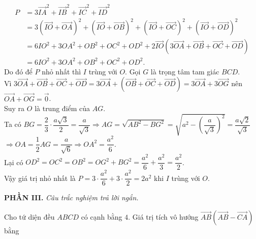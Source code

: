 \begin{ex}
{\begin{enumerate}[a)]
	\begin{align*}
	P& =3\vec{IA}^2+\vec{IB}^2+\vec{IC}^2+\vec{ID}^2 \\
	& =3\left(\vec{IO}+\vec{OA}\right)^2+\left(\vec{IO}+\vec{OB}\right)^2+\left(\vec{IO}+\vec{OC}\right)^2+\left(\vec{IO}+\vec{OD}\right)^2 \\
	& =6IO^2+3OA^2+OB^2+OC^2+OD^2+2\vec{IO}\left(3\vec{OA}+\vec{OB}+\vec{OC}+\vec{OD}\right) \\
	& =6IO^2+3OA^2+OB^2+OC^2+OD^2.
	\end{align*}
	Do đó để $P$ nhỏ nhất thì $I$ trùng với $O$. Gọi $G$ là trọng tâm tam giác $BCD$.\\
	Vì $3\vec{OA}+\vec{OB}+\vec{OC}+\vec{OD}=3\vec{OA}+\left(\vec{OB}+\vec{OC}+\vec{OD}\right) =3\vec{OA}+3\vec{OG}$ nên $\vec{OA}+\vec{OG}=\vec{0}$.\\	
	Suy ra $O$ là trung điểm của $AG$.\\
	Ta có $BG=\dfrac{2}{3} \cdot \dfrac{a\sqrt{3}}{2}=\dfrac{a}{\sqrt{3}}\Rightarrow AG=\sqrt{AB^2-BG^2}=\sqrt{a^2-{{\left(\dfrac{a}{\sqrt{3}}\right)}^2}}=\dfrac{a\sqrt{2}}{\sqrt{3}}$\\
	$\Rightarrow OA=\dfrac{1}{2}AG=\dfrac{a}{\sqrt{6}}\Rightarrow OA^2=\dfrac{a^2}{6}$.\\
	Lại có $OD^2=OC^2=OB^2=OG^2+BG^2=\dfrac{a^2}{6}+\dfrac{a^2}{3}=\dfrac{a^2}{2}$.\\
	Vậy giá trị nhỏ nhất là $P=3 \cdot \dfrac{a^2}{6}+3 \cdot \dfrac{a^2}{2}=2a^2$ khi $I$ trùng với $O$.
	\end{enumerate}
	}
\end{ex}
\textbf{PHẦN III.} \textit{Câu trắc nghiệm trả lời ngắn.}\\
\begin{ex}
	Cho tứ diện đều $ABCD$ có cạnh bằng $4$. Giá trị tích vô hướng $\vec{AB}\left(\vec{AB}-\vec{CA}\right)$ bằng
\end{ex}
